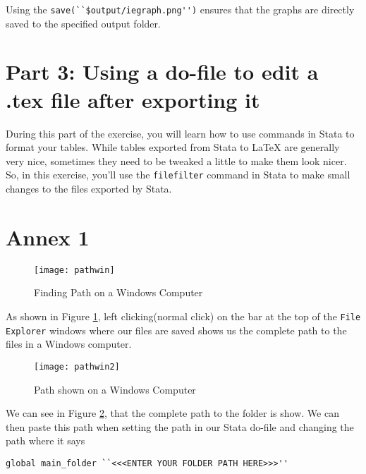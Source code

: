 \documentclass[]{article}
\begin{document}
Using the \verb|save(``$output/iegraph.png'')| ensures that the graphs are directly saved to the specified output folder. 

\section*{Part 3: Using a do-file to edit a .tex file after exporting it}

During this part of the exercise, you will learn how to use commands in Stata to format your tables. While tables exported from Stata to {\LaTeX} are generally very nice, sometimes they need to be tweaked a little to make them look nicer. So, in this exercise, you'll use the \texttt{filefilter} command in Stata to make small changes to the files exported by Stata. 

\newpage
\section*{Annex 1} {\label{annex1}}

\begin{figure}[H]
	\centering
	\texttt{[image: pathwin]}
	\caption{Finding Path on a Windows Computer}
	\label{fig:pathwin}
\end{figure}
As shown in Figure \ref{fig:pathwin}, left clicking(normal click) on the bar at the top of the \texttt{File Explorer} windows where our files are saved shows us the complete path to the files in a Windows computer. \\

\begin{figure}[H]
	\centering
	\texttt{[image: pathwin2]}
	\caption{Path shown on a Windows Computer}
	\label{fig:pathwin2}
\end{figure}

We can see in Figure \ref{fig:pathwin2}, that the complete path to the folder is show. We can then paste this path when setting the path in our Stata do-file and changing the path where it says \begin{verbatim}
global main_folder ``<<<ENTER YOUR FOLDER PATH HERE>>>''
\end{verbatim} 
	
\end{document}
